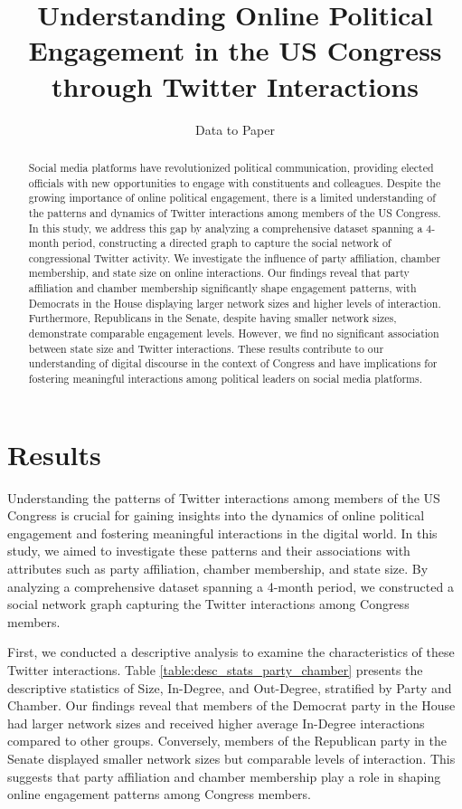 \documentclass[11pt]{article}
\title{Understanding Online Political Engagement in the US Congress through Twitter Interactions}
\author{Data to Paper}
\begin{document}
\maketitle
\begin{abstract}
Social media platforms have revolutionized political communication, providing elected officials with new opportunities to engage with constituents and colleagues. Despite the growing importance of online political engagement, there is a limited understanding of the patterns and dynamics of Twitter interactions among members of the US Congress. In this study, we address this gap by analyzing a comprehensive dataset spanning a 4-month period, constructing a directed graph to capture the social network of congressional Twitter activity. We investigate the influence of party affiliation, chamber membership, and state size on online interactions. Our findings reveal that party affiliation and chamber membership significantly shape engagement patterns, with Democrats in the House displaying larger network sizes and higher levels of interaction. Furthermore, Republicans in the Senate, despite having smaller network sizes, demonstrate comparable engagement levels. However, we find no significant association between state size and Twitter interactions. These results contribute to our understanding of digital discourse in the context of Congress and have implications for fostering meaningful interactions among political leaders on social media platforms.
\end{abstract}
\section*{Results}

Understanding the patterns of Twitter interactions among members of the US Congress is crucial for gaining insights into the dynamics of online political engagement and fostering meaningful interactions in the digital world. In this study, we aimed to investigate these patterns and their associations with attributes such as party affiliation, chamber membership, and state size. By analyzing a comprehensive dataset spanning a 4-month period, we constructed a social network graph capturing the Twitter interactions among Congress members.

First, we conducted a descriptive analysis to examine the characteristics of these Twitter interactions. Table \ref{table:desc_stats_party_chamber} presents the descriptive statistics of Size, In-Degree, and Out-Degree, stratified by Party and Chamber. Our findings reveal that members of the Democrat party in the House had larger network sizes and received higher average In-Degree interactions compared to other groups. Conversely, members of the Republican party in the Senate displayed smaller network sizes but comparable levels of interaction. This suggests that party affiliation and chamber membership play a role in shaping online engagement patterns among Congress members.
\end{document}
